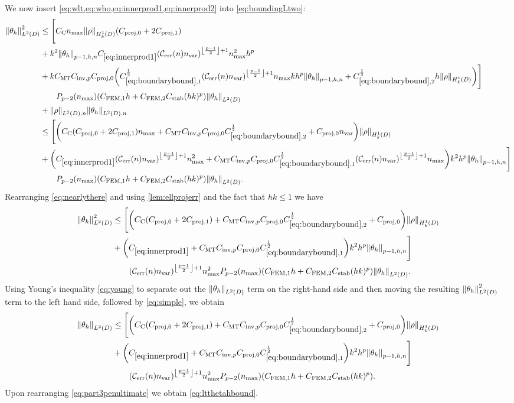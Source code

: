 We now insert \cref{eq:wlt,eq:who,eq:innerprod1,eq:innerprod2} into \cref{eq:boundingLtwo}:
\begin{align}
\NLtD{\thetah}^2 &\leq \Bigg[\Cc\nmax \NHokD{\rho} \mleft(\Cprojfn{0} + 2\Cprojfn{1}\mright)\\
&+k^2\Nfn{p-1,h,n}{\thetah}  \Cfourteen \mleft(\En \nvar\mright)^{\floor{\frac{p-1}2}+1}\nmax^2 h^p \\
&+k\CMT \CinvVhp \Cprojfn{0} \mleft(\Cboundaryo^{\half} \mleft(\En\nvar\mright)^{\floor{\frac{p-1}2}+1}\nmax k h^{p} \Nfn{p-1,h,n}{\thetah} + \Cboundaryt^{\half} h \NHokD{\rho}\mright)\Bigg]\nonumber\\
&\quad\quad \Pfn{p-2}\mleft(\nmax\mright)\mleft(\CFEMotilde h + \CFEMttilde \CAnk (hk)^p\mright)\NLtD{\thetah}\\
&+\NLtDn{\rho}\NLtDn{\thetah}\nonumber\\
&\leq \Bigg[\mleft(\Cc\mleft(\Cprojfn{0} + 2\Cprojfn{1}\mright)\nmax + \CMT \CinvVhp \Cprojfn{0} \Cboundaryt^{\half} + \Cprojfn{0}\nvar  \mright)\NHokD{\rho} \\
&+\mleft(  \Cfourteen \mleft(\En \nvar\mright)^{\floor{\frac{p-1}2}+1}\nmax^2 + \CMT \CinvVhp \Cprojfn{0}\Cboundaryo^{\half} \mleft(\En\nvar\mright)^{\floor{\frac{p-1}2}+1}\nmax\mright)k^2h^p\Nfn{p-1,h,n}{\thetah}\Bigg]\nonumber\\
&\quad\quad \Pfn{p-2}\mleft(\nmax\mright)\mleft(\CFEMotilde h + \CFEMttilde \CAnk (hk)^p\mright)\NLtD{\thetah}.\label{eq:nearlythere}
\end{align}
Rearranging \cref{eq:nearlythere} and using \cref{lem:ellprojerr} and the fact that $hk \leq 1$ we have
  \begin{align*}
\NLtD{\thetah}^2&\leq \Bigg[\mleft(\Cc\mleft(\Cprojfn{0} + 2\Cprojfn{1}\mright) + \CMT \CinvVhp \Cprojfn{0} \Cboundaryt^{\half} + \Cprojfn{0}  \mright)\NHokD{\rho} \nonumber\\
&+\mleft(  \Cfourteen  + \CMT \CinvVhp \Cprojfn{0}\Cboundaryo^{\half} \mright)k^2h^p\Nfn{p-1,h,n}{\thetah}\Bigg]\nonumber\\
&\quad\quad \mleft(\En \nvar\mright)^{\floor{\frac{p-1}2}+1}\nmax^2\Pfn{p-2}\mleft(\nmax\mright)\mleft(\CFEMotilde h + \CFEMttilde \CAnk (hk)^p\mright)\NLtD{\thetah}.
\end{align*}
  Using Young's inequality \cref{eq:young} to separate out the $\NLtD{\thetah}$ term on the right-hand side and then moving the resulting $\NLtD{\thetah}^2$ term to the left hand side, followed by \cref{eq:simple}, we obtain
\begin{align}
\NLtD{\thetah}&\leq \Bigg[\mleft(\Cc\mleft(\Cprojfn{0} + 2\Cprojfn{1}\mright) + \CMT \CinvVhp \Cprojfn{0} \Cboundaryt^{\half} + \Cprojfn{0}  \mright)\NHokD{\rho}\nonumber \\
&+\mleft(  \Cfourteen  + \CMT \CinvVhp \Cprojfn{0}\Cboundaryo^{\half} \mright)k^2h^p\Nfn{p-1,h,n}{\thetah}\Bigg]\nonumber\\
&\quad\quad \mleft(\En \nvar\mright)^{\floor{\frac{p-1}2}+1}\nmax^2\Pfn{p-2}\mleft(\nmax\mright)\mleft(\CFEMotilde h + \CFEMttilde \CAnk (hk)^p\mright)\label{eq:part3penultimate}.
\end{align}
Upon rearranging \cref{eq:part3penultimate} we obtain \cref{eq:ltthetahbound}.

